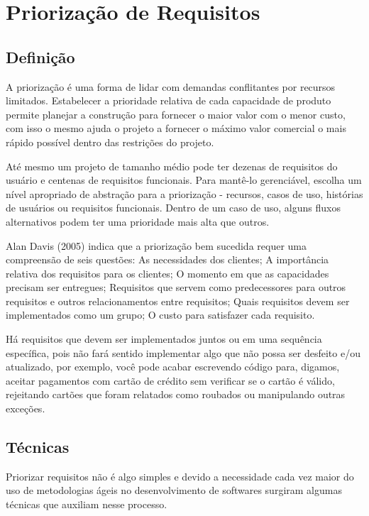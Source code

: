 \documentclass[runningheads]{llncs}
\begin{document}
\section{Priorização de Requisitos}

\subsection{Definição}
A priorização é uma forma de lidar com demandas conflitantes por recursos limitados. Estabelecer a prioridade relativa de cada capacidade de produto permite planejar a construção para fornecer o maior valor com o menor custo, com isso o mesmo ajuda o projeto a fornecer o máximo valor comercial o mais rápido possível dentro das restrições do projeto.

Até mesmo um projeto de tamanho médio pode ter dezenas de requisitos do usuário e centenas de requisitos funcionais. Para mantê-lo gerenciável, escolha um nível apropriado de abstração para a priorização - recursos, casos de uso, histórias de usuários ou requisitos funcionais. Dentro de um caso de uso, alguns fluxos alternativos podem ter uma prioridade mais alta que outros.

Alan Davis (2005) indica que a priorização bem sucedida requer uma compreensão de seis questões: As necessidades dos clientes; A importância relativa dos requisitos para os clientes; O momento em que as capacidades precisam ser entregues; Requisitos que servem como predecessores para outros requisitos e outros relacionamentos entre requisitos; Quais requisitos devem ser implementados como um grupo; O custo para satisfazer cada requisito.

Há requisitos que devem ser implementados juntos ou em uma sequência específica, pois não fará sentido implementar algo que não possa ser desfeito e/ou atualizado, por exemplo, você pode acabar escrevendo código para, digamos, aceitar pagamentos com cartão de crédito sem verificar se o cartão é válido, rejeitando cartões que foram relatados como roubados ou manipulando outras exceções.

\subsection{Técnicas}

Priorizar requisitos não é algo simples e devido a necessidade cada vez maior do uso de metodologias ágeis no desenvolvimento de softwares surgiram algumas técnicas que auxiliam nesse processo.
\end{document}

